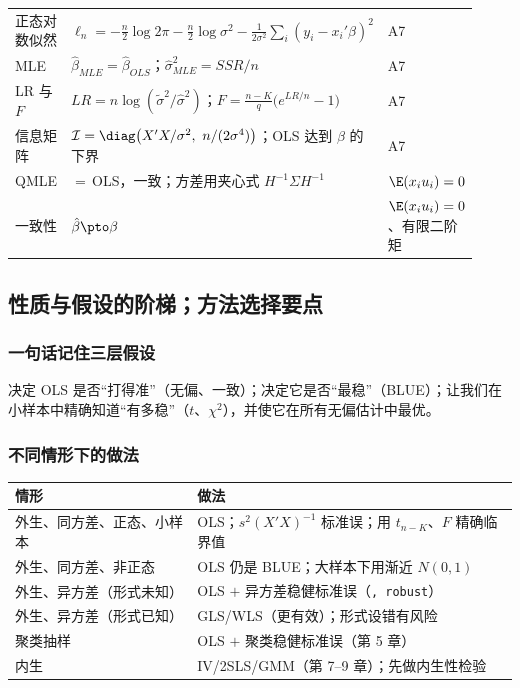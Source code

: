 {\begin{longtable}{>{\raggedright\arraybackslash}p{0.21\linewidth}>{\raggedright\arraybackslash}p{0.5\linewidth}>{\raggedright\arraybackslash}p{0.21\linewidth}}
正态对数似然 & $\ell_n=-\frac n2\log2\pi-\frac n2\log\sigma^2-\frac1{2\sigma^2}\sum_i(y_i-x_i'\beta)^2$ & A7\\
MLE & $\hat\beta_{MLE}=\hat\beta_{OLS}$；$\hat\sigma^2_{MLE}=SSR/n$ & A7\\
LR 与 $F$ & $LR=n\log(\tilde\sigma^2/\hat\sigma^2)$；$F=\frac{n-K}q\big(e^{LR/n}-1\big)$ & A7\\
信息矩阵 & $\mathcal I=\diag\big(X'X/\sigma^2,\ n/(2\sigma^4)\big)$；OLS 达到 $\beta$ 的下界 & A7\\
QMLE & $=\,$OLS，一致；方差用夹心式 $H^{-1}\Sigma H^{-1}$ & $\E(x_iu_i)=0$\\
一致性 & $\hat\beta\pto\beta$ & $\E(x_iu_i)=0$、有限二阶矩\\
\end{longtable}
}

\subsection{性质与假设的阶梯；方法选择要点}

\subsubsection{一句话记住三层假设}

决定 OLS 是否“打得准”（无偏、一致）；决定它是否“最稳”（BLUE）；让我们在小样本中精确知道“有多稳”（$t$、$\chi^2$），并使它在所有无偏估计中最优。

\subsubsection{不同情形下的做法}

\begin{center}
\small
\begin{tabularx}{\linewidth}{lL}
\toprule
情形 & 做法\\
\midrule
外生、同方差、正态、小样本 & OLS；$s^2(X'X)^{-1}$ 标准误；用 $t_{n-K}$、$F$ 精确临界值\\
外生、同方差、非正态 & OLS 仍是 BLUE；大样本下用渐近 $N(0,1)$\\
外生、异方差（形式未知） & OLS $+$ 异方差稳健标准误（\texttt{, robust}）\\
外生、异方差（形式已知） & GLS/WLS（更有效）；形式设错有风险\\
聚类抽样 & OLS $+$ 聚类稳健标准误（第 5 章）\\
内生 & IV/2SLS/GMM（第 7--9 章）；先做内生性检验\\
\bottomrule
\end{tabularx}
\end{center}

